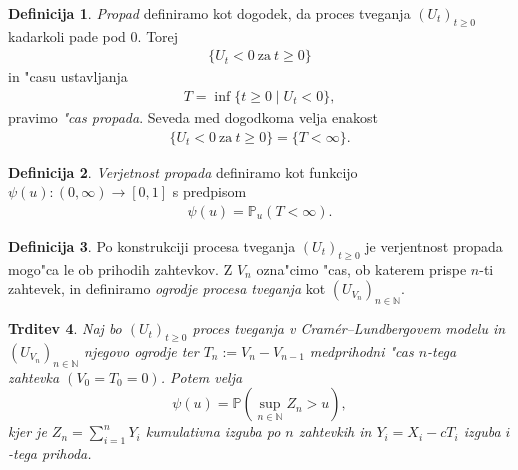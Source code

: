 \documentclass[12pt, a4paper, reqno]{amsart}
\theoremstyle{definition}
\newtheorem{definicija}{Definicija}[section]
\theoremstyle{plain}
\newtheorem{trditev}[definicija]{Trditev}
\newcommand{\N}{\mathbb{N}}
\newcommand{\Prob}{\mathbb{P}}
\newcommand{\1}{\mathds{1}}
\begin{document}
        \begin{definicija}
            \textit{Propad} definiramo kot dogodek, da proces tveganja $(U_t)_{t\geq0}$ kadarkoli pade pod $0$. 
            Torej 
            \begin{align*}
                \bigl\{U_t<0 \ \text{za} \ t\geq 0\bigr\}
            \end{align*}
            in "casu ustavljanja
            \begin{align*}
                T = \inf\{t\geq0 \mid U_t < 0\}, 
            \end{align*}
            pravimo \textit{"cas propada}. Seveda med dogodkoma velja enakost
            \begin{align*}
                \{U_t<0 \ \text{za} \ t\geq0\} = \{T<\infty\}.
            \end{align*}
            \label{def:PropadCasPropada} 
        \end{definicija}

        \begin{definicija}
            \textit{Verjetnost propada} definiramo kot funkcijo $\psi(u): (0,\infty) \to [0,1]$ 
            s predpisom
            \begin{align*}
                \psi(u) = \Prob_u(T<\infty).
            \end{align*}
            \label{def:VerjetnostPropada}
        \end{definicija}

        \begin{definicija}
            Po konstrukciji procesa tveganja $(U_t)_{t\geq0}$ je verjentnost propada mogo"ca le ob 
            prihodih zahtevkov. %
            Z $V_n$ ozna"cimo "cas, ob katerem prispe $n$-ti zahtevek, in definiramo 
            \textit{ogrodje procesa tveganja} kot $(U_{V_n})_{n\in\N}$.
            \label{def:ogrodjeProcesaTveganja}
        \end{definicija}

        \begin{trditev}
            Naj bo $(U_t)_{t\geq0}$ proces tveganja v Cramér--Lundbergovem modelu in $(U_{V_n})_{n\in\N}$ 
            njegovo ogrodje ter $T_n := V_n - V_{n-1}$ medprihodni "cas $n$-tega zahtevka 
            $(V_0 = T_0 = 0)$. Potem velja 
            \begin{equation*}
                \psi(u) = \Prob\left(\sup_{n\in\N}Z_n > u\right),
            \end{equation*}
            kjer je $Z_n = \sum_{i=1}^nY_i$  kumulativna izguba po $n$ zahtevkih in $Y_i = X_i - cT_i$
            izguba $i$-tega prihoda.
            \label{trd:verjetnostPropadaZOgrodjem}
        \end{trditev}
\end{document}
